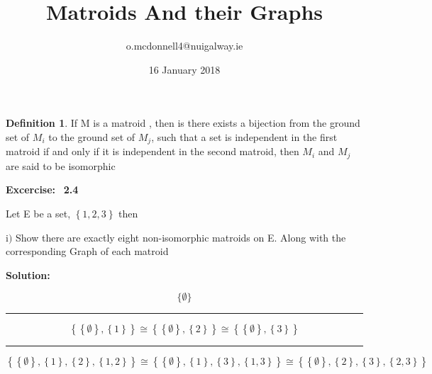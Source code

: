 \documentclass{article}
\title{Matroids And their Graphs}
\author{o.mcdonnell4@nuigalway.ie }
\date{16 January 2018}
\theoremstyle{plain}
\theoremstyle{definition}
\newtheorem{defn}{Definition}[section]
\theoremstyle{remark}
\newcounter{solution}
\newcommand\Excercise{%
  \textbf{Excercise:}~%
  \setcounter{solution}{0}%
}
\newcommand\TheSolution{%
  \textbf{Solution:}\\%
}
\begin{document}
\maketitle
 
  
\begin{defn}
If M is a matroid , then is there exists a bijection from the ground set of $ M_i $ to the ground set of $ M_j$, such that a set is independent in the first matroid if and only if it is independent in the second matroid, then $M_i$ and $M_j$ are said to be isomorphic 
\end{defn}


\noindent\Excercise \textbf{2.4}

\noindent Let E be a set, $ \left\{ 1, 2, 3 \right\}$ then

\noindent i$)$ Show there are exactly eight non-isomorphic matroids on E. 
 Along with the corresponding Graph of each matroid
    
    
\noindent\TheSolution
\hspace*{10px} 
  
\[ \{ \emptyset  \} \]  
  

\noindent\rule{12cm}{0.4pt}
\vspace{10px}

\[  \left\{ \left\{ \emptyset \right\} , \left\{ 1 \right\} \right\} \cong \left\{ \left\{ \emptyset \right\} , \left\{ 2 \right\} \right\} \cong \left\{ \left\{ \emptyset \right\} , \left\{ 3 \right\} \right\} \]   
 

\noindent\rule{12cm}{0.4pt}


\[ \left\{ \left\{ \emptyset \right\} , \left\{ 1 \right\},\left\{ 2 \right\} , \left\{ 1, 2 \right\} \right\} \cong  \left\{ \left\{ \emptyset \right\} , \left\{ 1 \right\}, \left\{ 3 \right\} , \left\{ 1, 3 \right\} \right\} \cong  \left\{ \left\{ \emptyset \right\} , \left\{ 2 \right\}, \left\{ 3 \right\} , \left\{ 2, 3 \right\} \right\} \] 
 
\end{document}
